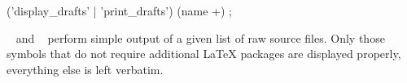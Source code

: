\begin{isabellebody}
\begin{isamarkuptext}
  \begin{rail}
    ('display\_drafts' | 'print\_drafts') (name +)
    ;
  \end{rail}

  \begin{description}

  \item \hyperlink{command.display-drafts}{\mbox{}}~ and \hyperlink{command.print-drafts}{\mbox{}}~ perform simple output of a given list
  of raw source files.  Only those symbols that do not require
  additional {\LaTeX} packages are displayed properly, everything else
  is left verbatim.

  \end{description}%
\end{isamarkuptext}%
\isamarkuptrue%
%
\isadelimtheory
%
\endisadelimtheory
%
\isatagtheory
{}\isamarkupfalse%
%
\endisatagtheory
{\isafoldtheory}%
%
\isadelimtheory
%
\endisadelimtheory
\isanewline
\end{isabellebody}%
